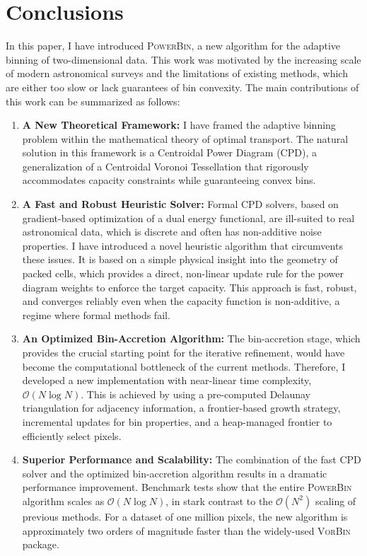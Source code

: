 \documentclass[fleqn,usenatbib]{mnras}
\begin{document}
\section{Conclusions}
\label{sec:conclusions}

In this paper, I have introduced \textsc{PowerBin}, a new algorithm for the adaptive binning of two-dimensional data. This work was motivated by the increasing scale of modern astronomical surveys and the limitations of existing methods, which are either too slow or lack guarantees of bin convexity. The main contributions of this work can be summarized as follows:

\begin{enumerate}
    \item \textbf{A New Theoretical Framework:} I have framed the adaptive binning problem within the mathematical theory of optimal transport. The natural solution in this framework is a Centroidal Power Diagram (CPD), a generalization of a Centroidal Voronoi Tessellation that rigorously accommodates capacity constraints while guaranteeing convex bins.

    \item \textbf{A Fast and Robust Heuristic Solver:} Formal CPD solvers, based on gradient-based optimization of a dual energy functional, are ill-suited to real astronomical data, which is discrete and often has non-additive noise properties. I have introduced a novel heuristic algorithm that circumvents these issues. It is based on a simple physical insight into the geometry of packed cells, which provides a direct, non-linear update rule for the power diagram weights to enforce the target capacity. This approach is fast, robust, and converges reliably even when the capacity function is non-additive, a regime where formal methods fail.

    \item \textbf{An Optimized Bin-Accretion Algorithm:} The bin-accretion stage, which provides the crucial starting point for the iterative refinement, would have become the computational bottleneck of the current methods. Therefore, I developed a new implementation with near-linear time complexity, $\mathcal{O}(N\log N)$. This is achieved by using a pre-computed Delaunay triangulation for adjacency information, a frontier-based growth strategy, incremental updates for bin properties, and a heap-managed frontier to efficiently select pixels.

    \item \textbf{Superior Performance and Scalability:} The combination of the fast CPD solver and the optimized bin-accretion algorithm results in a dramatic performance improvement. Benchmark tests show that the entire \textsc{PowerBin} algorithm scales as $\mathcal{O}(N\log N)$, in stark contrast to the $\mathcal{O}(N^2)$ scaling of previous methods. For a dataset of one million pixels, the new algorithm is approximately two orders of magnitude faster than the widely-used \textsc{VorBin} package.
\end{enumerate}
\end{document}
